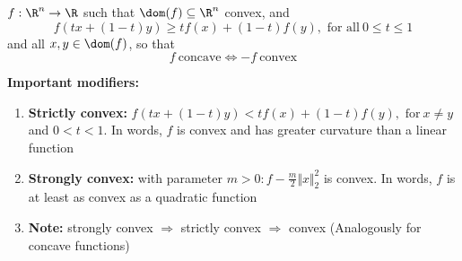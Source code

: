 \documentclass[a4paper]{article}
\begin{document}
{\begin{defi} 
$f: \R^n \rightarrow \R$ such that $\dom (f) \subseteq \R^n$ convex, and 
\[
    f(tx + (1-t)y) \geq tf(x) + (1-t)f(y),\text{\ for\ all}\ 0 \leq t \leq 1 
\]
and all $x, y \in \dom (f)$, so that 
\[
  f \ \text{concave} \Leftrightarrow -f \ \text{convex}
\]
\end{defi}

\noindent \textbf{Important modifiers:}
\begin{enumerate}
\item \textbf{Strictly convex:} $f(tx + (1-t)y) < tf(x) + (1-t)f(y),\text{\ for} \ x \neq y $ and $ 0 < t < 1$. In words, $f$ is convex and has greater curvature than a linear function
\item \textbf{Strongly convex:} with parameter  $m > 0: f - \frac{m}{2} \Vert x \Vert_2^2$ is convex. In words, $f$ is at least as convex as a quadratic function
\item \textbf{Note:} strongly convex $\Rightarrow $ strictly convex $\Rightarrow$ convex (Analogously for concave functions)
\end{enumerate}

}
\end{document}
